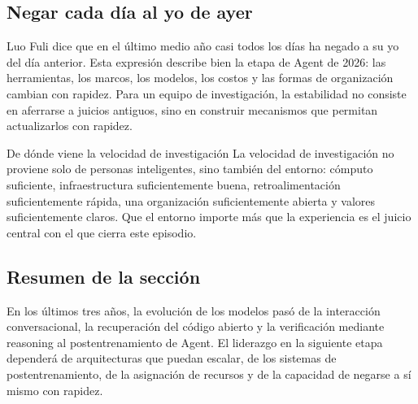 \subsection{Negar cada día al yo de ayer}

Luo Fuli dice que en el último medio año casi todos los días ha negado a su yo del día anterior. Esta expresión describe bien la etapa de Agent de 2026: las herramientas, los marcos, los modelos, los costos y las formas de organización cambian con rapidez. Para un equipo de investigación, la estabilidad no consiste en aferrarse a juicios antiguos, sino en construir mecanismos que permitan actualizarlos con rapidez.

\begin{importantbox}{De dónde viene la velocidad de investigación}
La velocidad de investigación no proviene solo de personas inteligentes, sino también del entorno: cómputo suficiente, infraestructura suficientemente buena, retroalimentación suficientemente rápida, una organización suficientemente abierta y valores suficientemente claros. Que el entorno importe más que la experiencia es el juicio central con el que cierra este episodio.
\end{importantbox}

\subsection{Resumen de la sección}

En los últimos tres años, la evolución de los modelos pasó de la interacción conversacional, la recuperación del código abierto y la verificación mediante reasoning al postentrenamiento de Agent. El liderazgo en la siguiente etapa dependerá de arquitecturas que puedan escalar, de los sistemas de postentrenamiento, de la asignación de recursos y de la capacidad de negarse a sí mismo con rapidez.
